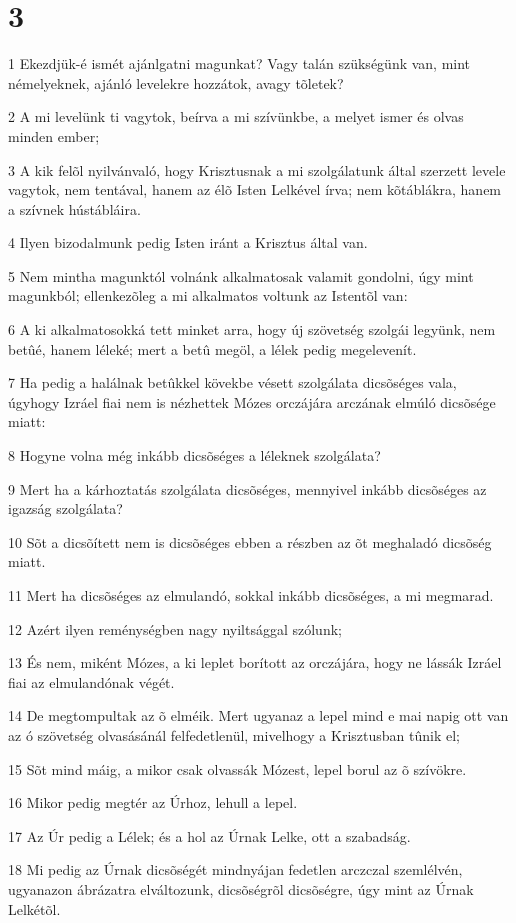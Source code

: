 \chapter{3}

\par 1 Ekezdjük-é ismét ajánlgatni magunkat? Vagy talán szükségünk van, mint némelyeknek, ajánló levelekre hozzátok, avagy tõletek?
\par 2 A mi levelünk ti vagytok, beírva a mi szívünkbe, a melyet ismer és olvas minden ember;
\par 3 A kik felõl nyilvánvaló, hogy Krisztusnak a mi szolgálatunk által szerzett levele vagytok, nem tentával, hanem az élõ Isten Lelkével írva; nem kõtáblákra, hanem a szívnek hústábláira.
\par 4 Ilyen bizodalmunk pedig Isten iránt a Krisztus által van.
\par 5 Nem mintha magunktól volnánk alkalmatosak valamit gondolni, úgy mint magunkból;  ellenkezõleg a mi alkalmatos voltunk az Istentõl van:
\par 6 A ki alkalmatosokká tett minket arra, hogy új szövetség szolgái legyünk, nem betûé, hanem léleké; mert a betû megöl,  a lélek pedig megelevenít.
\par 7 Ha pedig a halálnak betûkkel kövekbe vésett szolgálata dicsõséges vala, úgyhogy Izráel fiai nem is nézhettek Mózes  orczájára arczának elmúló dicsõsége miatt:
\par 8 Hogyne volna még inkább dicsõséges a léleknek szolgálata?
\par 9 Mert ha a kárhoztatás szolgálata dicsõséges, mennyivel inkább dicsõséges az igazság szolgálata?
\par 10 Sõt a dicsõített nem is dicsõséges ebben a részben az õt meghaladó dicsõség miatt.
\par 11 Mert ha dicsõséges az elmulandó, sokkal inkább dicsõséges, a mi megmarad.
\par 12 Azért ilyen reménységben nagy nyiltsággal szólunk;
\par 13 És nem, miként Mózes, a ki leplet borított az orczájára, hogy ne lássák Izráel fiai az elmulandónak végét.
\par 14 De megtompultak az õ elméik. Mert ugyanaz a lepel mind e mai napig ott van az ó szövetség olvasásánál felfedetlenül,  mivelhogy a Krisztusban tûnik el;
\par 15 Sõt mind máig, a mikor csak olvassák Mózest, lepel borul az õ szívökre.
\par 16 Mikor pedig megtér az Úrhoz, lehull a lepel.
\par 17 Az Úr pedig a Lélek; és a hol az Úrnak Lelke, ott a szabadság.
\par 18 Mi pedig az Úrnak dicsõségét mindnyájan fedetlen arczczal szemlélvén, ugyanazon ábrázatra elváltozunk, dicsõségrõl dicsõségre, úgy mint az Úrnak Lelkétõl.

